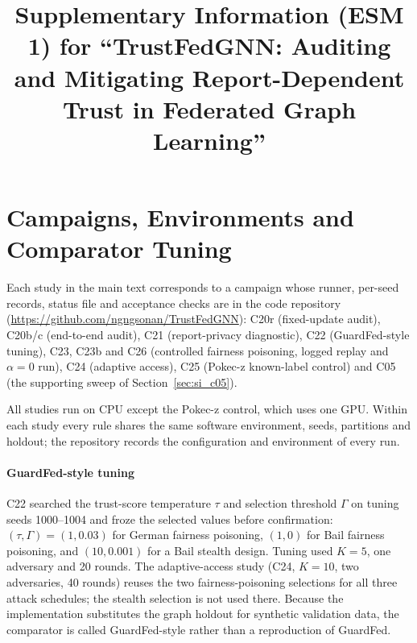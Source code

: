 \documentclass[pdflatex,sn-mathphys-num]{sn-jnl}
\begin{document}
\title[Supplementary Information: TrustFedGNN]{Supplementary Information (ESM 1) for ``TrustFedGNN: Auditing and Mitigating Report-Dependent Trust in Federated Graph Learning''}

\author[1]{ }
\author*[2]{ }
\author[1]{ }
\maketitle

\section{Campaigns, Environments and Comparator Tuning}
\label{sec:si_campaigns}
Each study in the main text corresponds to a campaign whose runner, per-seed records, status file and acceptance checks are in the code repository (\url{https://github.com/ngngsonan/TrustFedGNN}): C20r (fixed-update audit), C20b/c (end-to-end audit), C21 (report-privacy diagnostic), C22 (GuardFed-style tuning), C23, C23b and C26 (controlled fairness poisoning, logged replay and $\alpha=0$ run), C24 (adaptive access), C25 (Pokec-z known-label control) and C05 (the supporting sweep of Section~\ref{sec:si_c05}).

All studies run on CPU except the Pokec-z control, which uses one GPU. Within each study every rule shares the same software environment, seeds, partitions and holdout; the repository records the configuration and environment of every run.

\paragraph{GuardFed-style tuning}
C22 searched the trust-score temperature $\tau$ and selection threshold $\Gamma$ on tuning seeds 1000--1004 and froze the selected values before confirmation: $(\tau,\Gamma)=(1,0.03)$ for German fairness poisoning, $(1,0)$ for Bail fairness poisoning, and $(10,0.001)$ for a Bail stealth design. Tuning used $K=5$, one adversary and 20 rounds. The adaptive-access study (C24, $K=10$, two adversaries, 40 rounds) reuses the two fairness-poisoning selections for all three attack schedules; the stealth selection is not used there. Because the implementation substitutes the graph holdout for synthetic validation data, the comparator is called GuardFed-style rather than a reproduction of GuardFed.
\end{document}
